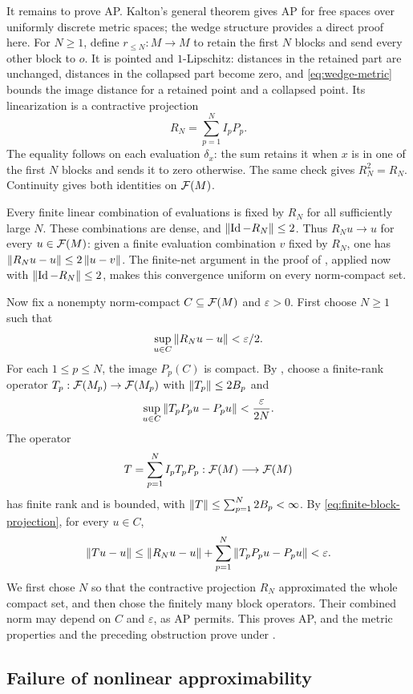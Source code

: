 It remains to prove AP. Kalton's general theorem
\cite[Proposition~4.4]{Kalton04} gives AP for free spaces over uniformly
discrete metric spaces; the wedge structure provides a direct proof here.
For $N\ge1$, define
$r_{\le N}:M\to M$ to retain the first $N$ blocks and send every other
block to $o$. It is pointed and $1$-Lipschitz: distances in the retained
part are unchanged, distances in the collapsed part become zero, and
\eqref{eq:wedge-metric} bounds the image distance for a retained point
and a collapsed point. Its linearization is a contractive projection
\begin{equation}\label{eq:finite-block-projection}
 R_N=\sum_{p=1}^N I_pP_p.
\end{equation}
The equality follows on each evaluation $\delta_x$: the sum retains it
when $x$ is in one of the first $N$ blocks and sends it to zero otherwise.
The same check gives $R_N^2=R_N$. Continuity gives both identities on
$\mathcal F(M)$.

Every finite linear combination of evaluations is fixed by $R_N$ for
all sufficiently large $N$. These combinations are dense, and
$\left\|\operatorname{Id}-R_N\right\|\le2$. Thus $R_Nu\to u$ for every $u\in\mathcal F(M)$:
given a finite evaluation combination $v$ fixed by $R_N$, one has
$\left\|R_Nu-u\right\|\le2\left\|u-v\right\|$. The finite-net argument in the proof of
, applied now with $\left\|\operatorname{Id}-R_N\right\|\le2$, makes
this convergence uniform on every norm-compact set.

Now fix a nonempty norm-compact $C\subseteq\mathcal F(M)$ and
$\varepsilon>0$. First choose $N\ge1$ such that
\[
 \sup_{u\in C}\left\|R_Nu-u\right\|<\varepsilon/2.
\]
For each $1\le p\le N$, the image $P_p(C)$ is compact. By
, choose a finite-rank operator
$T_p:\mathcal F(M_p)\to\mathcal F(M_p)$ with $\left\|T_p\right\|\le2B_p$ and
\[
 \sup_{u\in C}\left\|T_pP_pu-P_pu\right\|<\frac{\varepsilon}{2N}.
\]
The operator
\[
 T=\sum_{p=1}^N I_pT_pP_p:\mathcal F(M)\longrightarrow\mathcal F(M)
\]
has finite rank and is bounded, with
$\left\|T\right\|\le\sum_{p=1}^N2B_p<\infty$. By
\eqref{eq:finite-block-projection}, for every $u\in C$,
\[
 \left\|Tu-u\right\|
 \le\left\|R_Nu-u\right\|
       +\sum_{p=1}^N\left\|T_pP_pu-P_pu\right\|<\varepsilon.
\]
We first chose $N$ so that the contractive projection $R_N$ approximated
the whole compact set, and then chose the finitely many block operators.
Their combined norm may depend on $C$ and
$\varepsilon$, as AP permits. This proves AP, and the metric properties
and the preceding obstruction prove  under
.

\subsection{Failure of nonlinear approximability}\label{sec:nonlinear}


